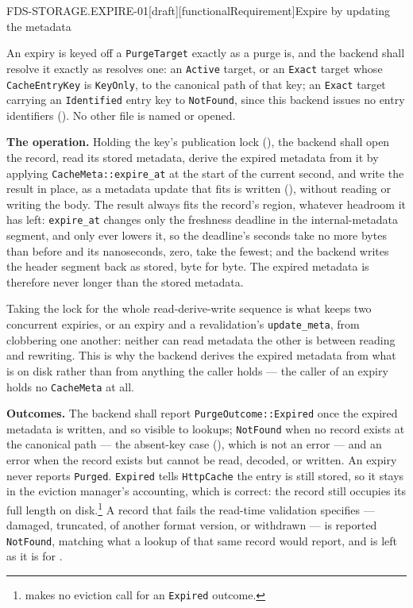 \begin{requirement}{FDS-STORAGE.EXPIRE-01}[draft][functionalRequirement]{Expire by updating the metadata}


  An expiry is keyed off a \texttt{PurgeTarget} exactly as a purge is, and the
  backend shall resolve it exactly as  resolves
  one: an \texttt{Active} target, or an \texttt{Exact} target whose
  \texttt{CacheEntryKey} is \texttt{KeyOnly}, to the canonical path of that
  key; an \texttt{Exact} target carrying an \texttt{Identified} entry key to
  \texttt{NotFound}, since this backend issues no entry identifiers
  (). No other file is named or opened.

  \textbf{The operation.} Holding the key's publication lock
  (), the backend shall open the record,
  read its stored metadata, derive the expired metadata from it by applying
  \texttt{CacheMeta::expire\_at} at the start of the current second, and
  write the result in place, as a metadata update that fits is written
  (), without reading or writing the body.
  The result always fits the record's region, whatever headroom it has
  left: \texttt{expire\_at} changes only the freshness deadline in the
  internal-metadata segment, and only ever lowers it, so the deadline's
  seconds take no more bytes than before and its nanoseconds, zero, take
  the fewest; and the backend writes the header segment back as stored,
  byte for byte. The expired metadata is therefore never longer than the
  stored metadata.

  Taking the lock for the whole read-derive-write sequence is what keeps two
  concurrent expiries, or an expiry and a revalidation's
  \texttt{update\_meta}, from clobbering one another: neither can read
  metadata the other is between reading and rewriting. This is why the backend
  derives the expired metadata from what is on disk rather than from anything
  the caller holds --- the caller of an expiry holds no \texttt{CacheMeta} at
  all.

  \textbf{Outcomes.} The backend shall report \texttt{PurgeOutcome::Expired}
  once the expired metadata is written, and so visible to lookups;
  \texttt{NotFound} when no record exists at the canonical path --- the
  absent-key case (), which is not an
  error --- and an error when the record exists but cannot be read, decoded,
  or written. An expiry never reports \texttt{Purged}. \texttt{Expired}
  tells \texttt{HttpCache} the entry is still stored, so it stays in the
  eviction manager's accounting, which is correct: the record still occupies
  its full length on
  disk.\footnote{
  makes no eviction call for an \texttt{Expired} outcome.} A record
  that fails the read-time validation 
  specifies --- damaged, truncated, of another format version, or withdrawn
  --- is reported \texttt{NotFound}, matching what a lookup of that same
  record would report, and is left as it is for
  .


\end{requirement}
